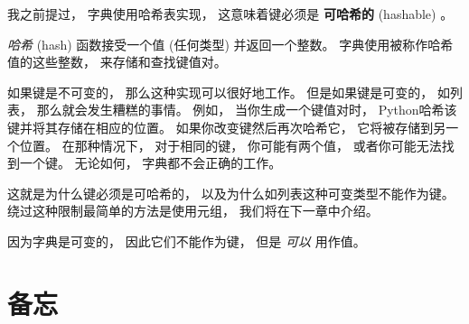 %

我之前提过， 字典使用哈希表实现， 这意味着键必须是 {\bf 可哈希的} (hashable) 。

  



{\em 哈希} (hash) 函数接受一个值 (任何类型) 并返回一个整数。
字典使用被称作哈希值的这些整数， 来存储和查找键值对。


如果键是不可变的， 那么这种实现可以很好地工作。
但是如果键是可变的， 如列表， 那么就会发生糟糕的事情。
例如， 当你生成一个键值对时， Python哈希该键并将其存储在相应的位置。
如果你改变键然后再次哈希它， 它将被存储到另一个位置。
在那种情况下， 对于相同的键， 你可能有两个值，  或者你可能无法找到一个键。
无论如何， 字典都不会正确的工作。


这就是为什么键必须是可哈希的， 以及为什么如列表这种可变类型不能作为键。
绕过这种限制最简单的方法是使用元组，  我们将在下一章中介绍。


因为字典是可变的， 因此它们不能作为键， 但是 {\em 可以} 用作值。


\section{备忘}
\label{memoize}


